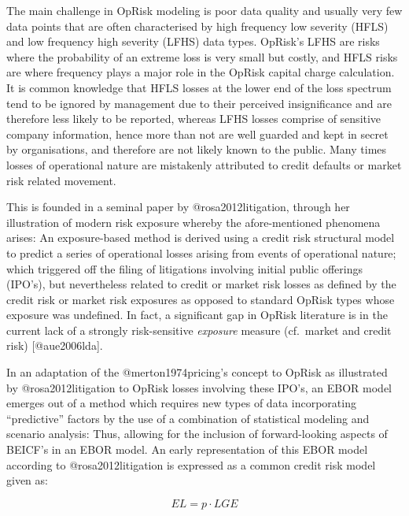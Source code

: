 \documentclass[
]{article}
\begin{document}
The main challenge in OpRisk modeling is poor data quality and usually
very few data points that are often characterised by high frequency low
severity (HFLS) and low frequency high severity (LFHS) data types.
OpRisk's LFHS are risks where the probability of an extreme loss is very
small but costly, and HFLS risks are where frequency plays a major role
in the OpRisk capital charge calculation. It is common knowledge that
HFLS losses at the lower end of the loss spectrum tend to be ignored by
management due to their perceived insignificance and are therefore less
likely to be reported, whereas LFHS losses comprise of sensitive company
information, hence more than not are well guarded and kept in secret by
organisations, and therefore are not likely known to the public. Many
times losses of operational nature are mistakenly attributed to credit
defaults or market risk related movement.\medskip

This is founded in a seminal paper by @rosa2012litigation, through her
illustration of modern risk exposure whereby the afore-mentioned
phenomena arises: An exposure-based method is derived using a credit
risk structural model to predict a series of operational losses arising
from events of operational nature; which triggered off the filing of
litigations involving initial public offerings (IPO's), but nevertheless
related to credit or market risk losses as defined by the credit risk or
market risk exposures as opposed to standard OpRisk types whose exposure
was undefined. In fact, a significant gap in OpRisk literature is in the
current lack of a strongly risk-sensitive \emph{exposure} measure
(cf.~market and credit risk) {[}@aue2006lda{]}.\medskip

In an adaptation of the @merton1974pricing's concept to OpRisk as
illustrated by @rosa2012litigation to OpRisk losses involving these
IPO's, an EBOR model emerges out of a method which requires new types of
data incorporating ``predictive'' factors by the use of a combination of
statistical modeling and scenario analysis: Thus, allowing for the
inclusion of forward-looking aspects of BEICF's in an EBOR model. An
early representation of this EBOR model according to @rosa2012litigation
is expressed as a common credit risk model given as:\medskip

\singlespacing

\begin{equation}\label{EBORmethod}
EL = p \cdot LGE 
\end{equation} \doublespacing
\end{document}
